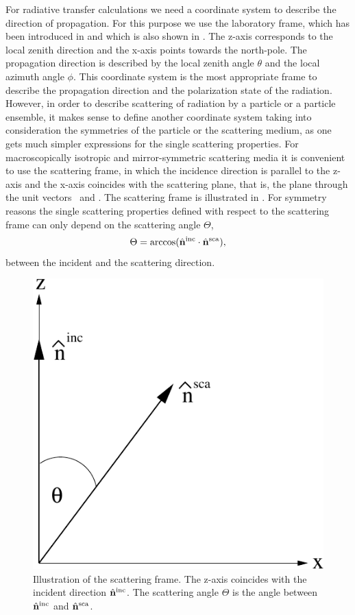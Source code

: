 For radiative transfer calculations we need a coordinate system to
describe the direction of propagation. For this purpose we use the
laboratory frame, which has been introduced in
 and which is also shown in .
The z-axis corresponds to the local zenith direction and the x-axis
points towards the north-pole. The propagation direction is described
by the local zenith angle $\theta$ and the local azimuth angle $\phi$.
This coordinate system is the most appropriate frame to describe the
propagation direction and the polarization state of the radiation.
However, in order to describe scattering of radiation by a particle or
a particle ensemble, it makes sense to define another coordinate
system taking into consideration the symmetries of the particle or the
scattering medium, as one gets much simpler expressions for the single
scattering properties.  For macroscopically isotropic and
mirror-symmetric scattering media it is convenient to use the
scattering frame, in which the incidence direction is parallel to the
z-axis and the x-axis coincides with the scattering plane, that is,
the plane through the unit vectors \ and
. The scattering frame is illustrated in
. For symmetry reasons the single scattering
properties defined with respect to the scattering frame can only
depend on the scattering angle $\Theta$,
\begin{equation}
  \label{eq:scat_angle}
  \Theta=\arccos(\hat{{\bf n}}^{\mathrm{inc}} \cdot {\hat{\ensuremath{{\bf n}}}^{\mathrm{sca}}}),
\end{equation}
between the incident and the scattering direction.

\begin{figure}[htbp]
 \begin{center}
   \includegraphics*[width=0.4\hsize]{./Figs/scattering/part_frame}
   \caption{Illustration of the scattering frame. The z-axis coincides with the incident direction $\hat{{\bf n}}^{\mathrm{inc}}$. The scattering angle $\Theta$ is the angle between  $\hat{{\bf n}}^{\mathrm{inc}}$ and $\hat{{\bf n}}^{\mathrm{sca}}$.}
   \label{fig:scattering:part_frame}  
 \end{center}
\end{figure}

